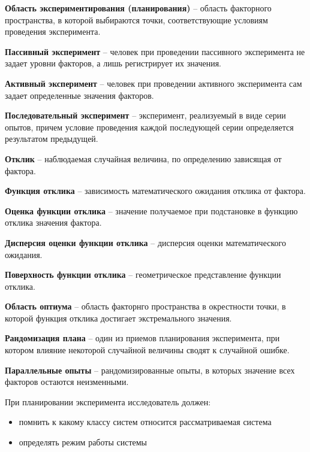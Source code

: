 \textbf{Область экспериментирования (планирования)} -- область факторного пространства, в которой выбираются точки, соответствующие условиям проведения эксперимента.

\textbf{Пассивный эксперимент} -- человек при проведении пассивного эксперимента не задает уровни факторов, а лишь регистрирует их значения.

\textbf{Активный эксперимент} -- человек при проведении активного эксперимента сам задает определенные значения факторов.

\textbf{Последовательный эксперимент} -- эксперимент, реализуемый в виде серии опытов, причем условие проведения каждой последующей серии определяется результатом предыдущей.

\textbf{Отклик} -- наблюдаемая случайная величина, по определению зависящая от фактора.

\textbf{Функция отклика} -- зависимость математического ожидания отклика от фактора.

\textbf{Оценка функции отклика} -- значение получаемое при подстановке в функцию отклика значения фактора.

\textbf{Дисперсия оценки функции отклика} -- дисперсия оценки математического ожидания.

\textbf{Поверхность функции отклика} -- геометрическое представление функции отклика.

\textbf{Область оптиума} -- область факторнго пространства в окрестности точки, в которой функция отклика достигает экстремального значения.

\textbf{Рандомизация плана} -- один из приемов планирования эксперимента, при котором влияние некоторой случайной величины сводят к случайной ошибке.

\textbf{Параллельные опыты} -- рандомизированные опыты, в которых значение всех факторов остаются неизменными.

При планировании эксперимента исследователь должен:

\begin{itemize}
    \item помнить к какому классу систем относится рассматриваемая система
    \item определять режим работы системы
\end{itemize}
